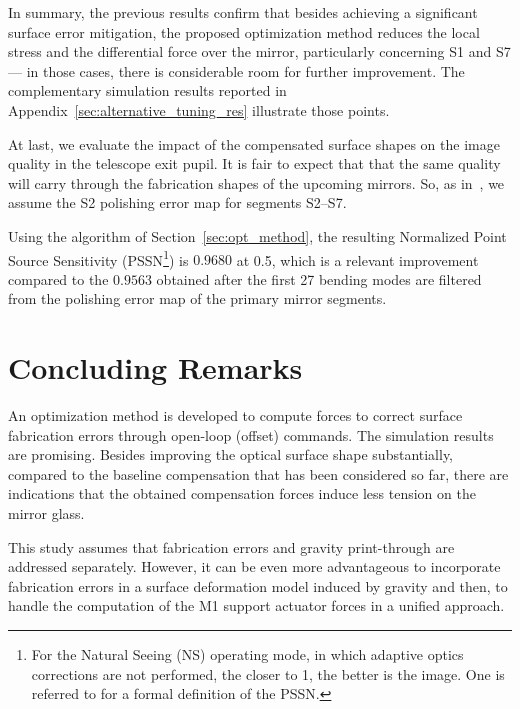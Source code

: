 \documentclass{gmto}
\begin{document}
In summary, the previous results confirm that besides achieving a significant surface error mitigation, the proposed optimization method reduces the local stress and the differential force over the mirror, particularly concerning \textsf{S1} and \textsf{S7} --- in those cases, there is considerable room for further improvement. The complementary simulation results reported in Appendix~\ref{sec:alternative_tuning_res} illustrate those points.


At last, we evaluate the impact of the compensated surface shapes on the image quality in the telescope exit pupil. It is fair to expect that that the same quality will carry through the fabrication shapes of the upcoming mirrors. So, as in~\cite{GMT_DOC_04637}, we assume the \textsf{S2} polishing error map for segments \textsf{S2}--\textsf{S7}.


Using the algorithm of Section~\ref{sec:opt_method}, the resulting Normalized Point Source Sensitivity (PSSN\footnote{
For the Natural Seeing (NS) operating mode, in which adaptive optics corrections are not performed, the closer to 1, the better is the image. One is referred to \cite[Section~3]{GMT_DOC_04680} for a formal definition of the PSSN.
}) is $0.9680$ 
at \SI{0.5}{\micron}, which is a relevant improvement compared to the $0.9563$ obtained  after the first 27 bending modes are filtered from the polishing error map of the primary mirror segments.









\section{Concluding Remarks}
\label{sec:conclusions}


An optimization method is developed to compute forces to correct surface fabrication errors through open-loop (offset) commands. The simulation results are promising. Besides improving the optical surface shape substantially, compared to the baseline compensation that has been considered so far, there are indications that the obtained compensation forces induce less tension on the mirror glass.

This study assumes that fabrication errors and gravity print-through are addressed separately. However,  it can be even more advantageous to incorporate fabrication errors in a surface deformation model induced by gravity and then, to handle the computation of the M1 support actuator forces in a unified approach.
\end{document}
